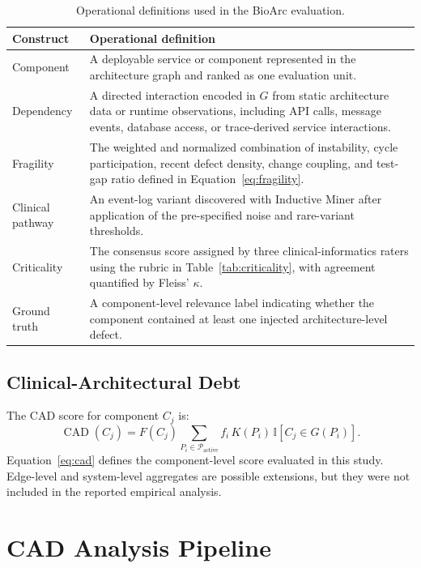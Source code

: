 \documentclass[english,preprint]{elsarticle}
\newcommand{\CAD}{\textsc{CAD}\xspace}
\newcommand{\indicator}[1]{\mathbb{I}\!\left[#1\right]}
\begin{document}
\begin{table}[htbp]
\caption{Operational definitions used in the BioArc evaluation.}
\label{tab:operational}
\small
\begin{tabularx}{\textwidth}{@{}p{}Y@{}}
\toprule
\textbf{Construct} & \textbf{Operational definition} \\
\midrule
Component & A deployable service or component represented in the architecture graph and ranked as one evaluation unit. \\
Dependency & A directed interaction encoded in $G$ from static architecture data or runtime observations, including API calls, message events, database access, or trace-derived service interactions. \\
Fragility & The weighted and normalized combination of instability, cycle participation, recent defect density, change coupling, and test-gap ratio defined in Equation~\eqref{eq:fragility}. \\
Clinical pathway & An event-log variant discovered with Inductive Miner after application of the pre-specified noise and rare-variant thresholds. \\
Criticality & The consensus score assigned by three clinical-informatics raters using the rubric in Table~\ref{tab:criticality}, with agreement quantified by Fleiss' $\kappa$. \\
Ground truth & A component-level relevance label indicating whether the component contained at least one injected architecture-level defect. \\
\bottomrule
\end{tabularx}
\end{table}

\subsection{Clinical-Architectural Debt}

The \CAD score for component $C_j$ is:
\begin{equation}
\operatorname{CAD}(C_j)=F(C_j)
\sum_{P_i\in\mathcal{P}_{\mathrm{active}}}
 f_i\,K(P_i)\,\indicator{C_j\in G(P_i)}.
\label{eq:cad}
\end{equation}
Equation~\eqref{eq:cad} defines the component-level score evaluated in this study. Edge-level and system-level aggregates are possible extensions, but they were not included in the reported empirical analysis.

\section{CAD Analysis Pipeline}\label{sec:pipeline}
\end{document}
